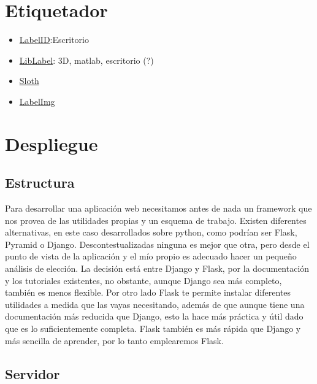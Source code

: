 
\section{Etiquetador}


\begin{itemize}
	\item \href{https://sweppner.github.io/labeld/}{LabelID}:Escritorio
	\item \href{http://www.cvlibs.net/software/liblabel/}{LibLabel}: 3D, matlab, escritorio (?)
	\item \href{https://cvhci.anthropomatik.kit.edu/~baeuml/projects/a-universal-labeling-tool-for-computer-vision-sloth/}{Sloth}
	\item \href{https://github.com/tzutalin/labelImg}{LabelImg}
\end{itemize}

\section{Despliegue}
\subsection{Estructura}
Para desarrollar una aplicación web necesitamos antes de nada un framework que nos provea de las utilidades propias y un esquema de trabajo. Existen diferentes alternativas, en este caso desarrollados sobre python, como podrían ser Flask, Pyramid o Django. Descontestualizadas ninguna es mejor que otra, pero desde el punto de vista de la aplicación y el mío propio es adecuado hacer un pequeño análisis de elección.
La decisión está entre Django y Flask, por la documentación y los tutoriales existentes, no obstante, aunque Django sea más completo, también es menos flexible. Por otro lado Flask te permite instalar diferentes utilidades a medida que las vayas necesitando, además de que aunque tiene una documentación más reducida que Django, esto la hace más práctica y útil dado que es lo suficientemente completa. Flask también es más rápida que Django y más sencilla de aprender, por lo tanto emplearemos Flask.
\subsection{Servidor}